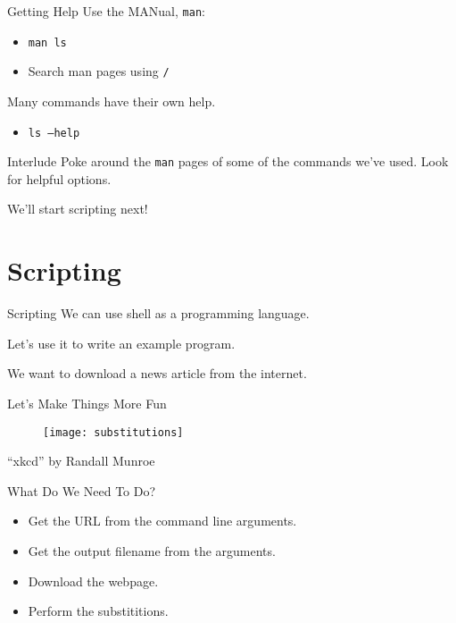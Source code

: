 \documentclass[pdf,usenames,dvipsnames,14pt]{beamer}%
\begin{document}
\begin{frame}{Getting Help}
	Use the MANual, \texttt{man}:
	\begin{itemize}
		\item \texttt{man ls}
		\item Search man pages using \texttt{/}
	\end{itemize}
	Many commands have their own help.
	\begin{itemize}
		\item \texttt{ls --help}
	\end{itemize}
\end{frame}

\begin{frame}{Interlude}
	Poke around the \texttt{man} pages of some of the commands we've used. Look for helpful options.
	
	We'll start scripting next!
\end{frame}

\section{Scripting}

\begin{frame}{Scripting}
	We can use shell as a programming language.
	
	Let's use it to write an example program.
	
	We want to download a news article from the internet.
\end{frame}

\begin{frame}{Let's Make Things More Fun}
	\begin{figure}
		\texttt{[image: substitutions]}
	\end{figure}
	``xkcd'' by Randall Munroe
\end{frame}

\begin{frame}{What Do We Need To Do?}
	\begin{itemize}
		\item Get the URL from the command line arguments.
		\item Get the output filename from the arguments.
		\item Download the webpage.
		\item Perform the substititions.
	\end{itemize}
\end{frame}
\end{document}
